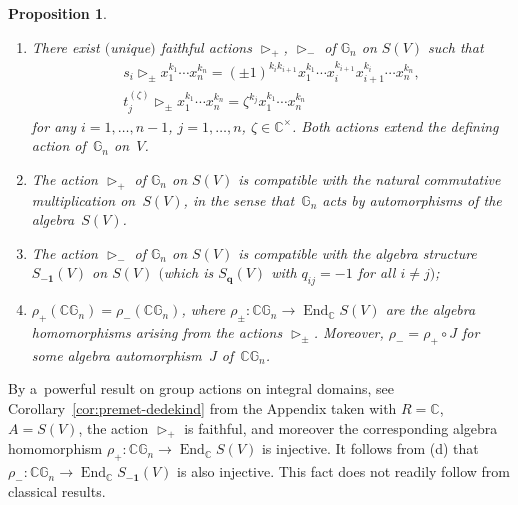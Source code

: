 \documentclass[11pt]{article}
\DeclareMathOperator{\End}{End}
\newtheorem{Proposition}[Theorem]{Proposition}
\begin{document}
\begin{Proposition}\label{prop:automorphism}\quad
\begin{enumerate}\itemsep=0pt
\item[$(a)$] There exist $($unique$)$ faithful actions $\mathop{\triangleright}\nolimits_+$, $\mathop{\triangleright}\nolimits_-$ of
$\mathbb G_n$ on $S(V)$ such that
\begin{gather*}
s_i \mathop{\triangleright}\nolimits_\pm x_1^{k_1}\cdots x_n^{k_n} = (\pm 1)^{k_ik_{i+1}} x_1^{k_1}\cdots
x_i^{k_{i+1}}x_{i+1}^{k_i}\cdots x_n^{k_n},
\\
t_j^{(\zeta)}\mathop{\triangleright}\nolimits_\pm x_1^{k_1}\cdots x_n^{k_n} = \zeta^{k_j} x_1^{k_1}\cdots
x_n^{k_n}
\end{gather*}
for any $i=1,\ldots,n-1$, $j=1,\ldots,n$, $\zeta\in \mathbb C^\times$.
Both actions extend the defining action of~$\mathbb G_n$ on~$V$.

\item[$(b)$] The action $\mathop{\triangleright}\nolimits_+$ of $\mathbb G_n$ on $S(V)$ is compatible with the natural
commutative multiplication on~$S(V)$, in the sense that~$\mathbb G_n$ acts by automorphisms of the algebra~$S(V)$.

\item[$(c)$] The action $\mathop{\triangleright}\nolimits_-$ of $\mathbb G_n$ on $S(V)$ is compatible    with the
algebra structure $S_{\mathbf{-1}}(V)$ on $S(V)$ $($which is $S_{\mathbf q}(V)$ with $q_{ij}=-1$ for all $i\ne j)$;

\item[$(d)$] $\rho_+(\mathbb C \mathbb G_n)= \rho_-(\mathbb C \mathbb G_n)$, where $\rho_\pm\colon \mathbb C\mathbb G_n \to
\End_\mathbb C S(V)$ are the algebra homomorphisms arising from the actions $\mathop{\triangleright}\nolimits_\pm$.
Moreover, $\rho_-=\rho_+ \circ J$ for some algebra automorphism~$J$ of~$\mathbb C \mathbb G_n$.
\end{enumerate}
\end{Proposition}

\begin{Remark}
\label{rem:injectivity}
By a~powerful result on group actions on integral domains, see Corollary~\ref{cor:premet-dedekind} from the
Appendix taken with $R=\mathbb C$, $A=S(V)$, the action $\mathop{\triangleright}\nolimits_+$ is faithful, and
moreover the corresponding algebra homomorphism $\rho_+\colon \mathbb C \mathbb G_n \to \End_\mathbb C S(V)$ is
injective.
It follows from (d) that $\rho_-\colon \mathbb C \mathbb G_n\to \End_\mathbb C S_{\mathbf{-1}}(V)$ is also injective.
This fact does not readily follow from classical results.
\end{Remark}
\end{document}

